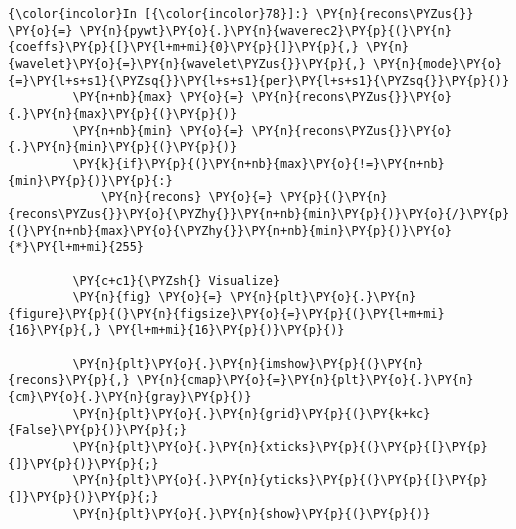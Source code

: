     \begin{Verbatim}[commandchars=\\\{\}]
{\color{incolor}In [{\color{incolor}78}]:} \PY{n}{recons\PYZus{}} \PY{o}{=} \PY{n}{pywt}\PY{o}{.}\PY{n}{waverec2}\PY{p}{(}\PY{n}{coeffs}\PY{p}{[}\PY{l+m+mi}{0}\PY{p}{]}\PY{p}{,} \PY{n}{wavelet}\PY{o}{=}\PY{n}{wavelet\PYZus{}}\PY{p}{,} \PY{n}{mode}\PY{o}{=}\PY{l+s+s1}{\PYZsq{}}\PY{l+s+s1}{per}\PY{l+s+s1}{\PYZsq{}}\PY{p}{)}
         \PY{n+nb}{max} \PY{o}{=} \PY{n}{recons\PYZus{}}\PY{o}{.}\PY{n}{max}\PY{p}{(}\PY{p}{)}
         \PY{n+nb}{min} \PY{o}{=} \PY{n}{recons\PYZus{}}\PY{o}{.}\PY{n}{min}\PY{p}{(}\PY{p}{)}
         \PY{k}{if}\PY{p}{(}\PY{n+nb}{max}\PY{o}{!=}\PY{n+nb}{min}\PY{p}{)}\PY{p}{:}
             \PY{n}{recons} \PY{o}{=} \PY{p}{(}\PY{n}{recons\PYZus{}}\PY{o}{\PYZhy{}}\PY{n+nb}{min}\PY{p}{)}\PY{o}{/}\PY{p}{(}\PY{n+nb}{max}\PY{o}{\PYZhy{}}\PY{n+nb}{min}\PY{p}{)}\PY{o}{*}\PY{l+m+mi}{255}
         
         \PY{c+c1}{\PYZsh{} Visualize}
         \PY{n}{fig} \PY{o}{=} \PY{n}{plt}\PY{o}{.}\PY{n}{figure}\PY{p}{(}\PY{n}{figsize}\PY{o}{=}\PY{p}{(}\PY{l+m+mi}{16}\PY{p}{,} \PY{l+m+mi}{16}\PY{p}{)}\PY{p}{)}
         
         \PY{n}{plt}\PY{o}{.}\PY{n}{imshow}\PY{p}{(}\PY{n}{recons}\PY{p}{,} \PY{n}{cmap}\PY{o}{=}\PY{n}{plt}\PY{o}{.}\PY{n}{cm}\PY{o}{.}\PY{n}{gray}\PY{p}{)}
         \PY{n}{plt}\PY{o}{.}\PY{n}{grid}\PY{p}{(}\PY{k+kc}{False}\PY{p}{)}\PY{p}{;}
         \PY{n}{plt}\PY{o}{.}\PY{n}{xticks}\PY{p}{(}\PY{p}{[}\PY{p}{]}\PY{p}{)}\PY{p}{;}
         \PY{n}{plt}\PY{o}{.}\PY{n}{yticks}\PY{p}{(}\PY{p}{[}\PY{p}{]}\PY{p}{)}\PY{p}{;}
         \PY{n}{plt}\PY{o}{.}\PY{n}{show}\PY{p}{(}\PY{p}{)}
\end{Verbatim}


    \begin{center}
    \end{center}
    { \hspace*{\fill} \\}
    
